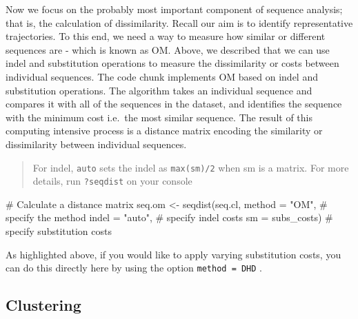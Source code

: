 \documentclass[
  letterpaper,
  DIV=11,
  numbers=noendperiod]{scrreprt}
\newenvironment{Shaded}{\begin{snugshade}}{\end{snugshade}}
\newcommand{\AttributeTok}[1]{\textcolor[rgb]{0.40,0.45,0.13}{#1}}
\newcommand{\CommentTok}[1]{\textcolor[rgb]{0.37,0.37,0.37}{#1}}
\newcommand{\FunctionTok}[1]{\textcolor[rgb]{0.28,0.35,0.67}{#1}}
\newcommand{\NormalTok}[1]{\textcolor[rgb]{0.00,0.23,0.31}{#1}}
\newcommand{\OtherTok}[1]{\textcolor[rgb]{0.00,0.23,0.31}{#1}}
\newcommand{\StringTok}[1]{\textcolor[rgb]{0.13,0.47,0.30}{#1}}
\begin{document}
Now we focus on the probably most important component of sequence
analysis; that is, the calculation of dissimilarity. Recall our aim is
to identify representative trajectories. To this end, we need a way to
measure how similar or different sequences are - which is known as OM.
Above, we described that we can use indel and substitution operations to
measure the dissimilarity or costs between individual sequences. The
code chunk implements OM based on indel and substitution operations. The
algorithm takes an individual sequence and compares it with all of the
sequences in the dataset, and identifies the sequence with the minimum
cost i.e.~the most similar sequence. The result of this computing
intensive process is a distance matrix encoding the similarity or
dissimilarity between individual sequences.

\begin{quote}
For indel, \texttt{auto} sets the indel as \texttt{max(sm)/2} when sm is
a matrix. For more details, run \texttt{?seqdist} on your console
\end{quote}

\begin{Shaded}
\begin{Highlighting}[]
\CommentTok{\# Calculate a distance matrix}
\NormalTok{seq.om }\OtherTok{\textless{}{-}} \FunctionTok{seqdist}\NormalTok{(seq.cl,}
                  \AttributeTok{method =} \StringTok{"OM"}\NormalTok{, }\CommentTok{\# specify the method}
                  \AttributeTok{indel =} \StringTok{"auto"}\NormalTok{, }\CommentTok{\# specify indel costs}
                  \AttributeTok{sm =}\NormalTok{ subs\_costs) }\CommentTok{\# specify substitution costs}
\end{Highlighting}
\end{Shaded}

As highlighted above, if you would like to apply varying substitution
costs, you can do this directly here by using the option
\texttt{method\ =\ DHD} .

\hypertarget{clustering}{%
\subsection{Clustering}\label{clustering}}
\end{document}
